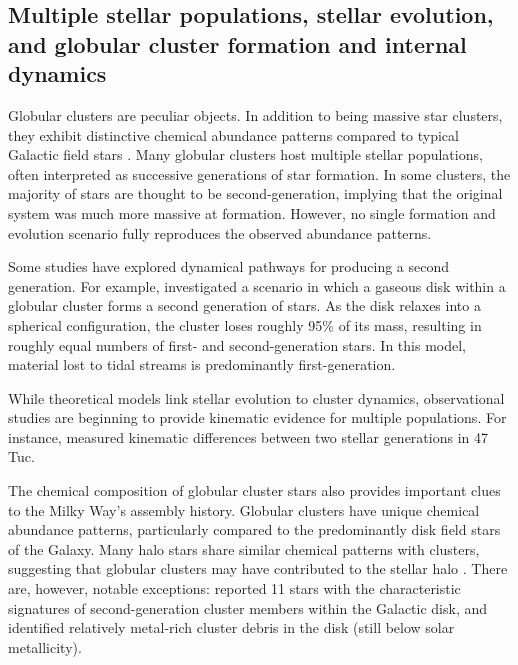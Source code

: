     \subsection{Multiple stellar populations, stellar evolution, and globular cluster formation and internal dynamics}
        Globular clusters are peculiar objects. In addition to being massive star clusters, they exhibit distinctive chemical abundance patterns compared to typical Galactic field stars \citep{2012A&ARv..20...50G,2018ARA&A..56...83B,2019A&ARv..27....8G}. Many globular clusters host multiple stellar populations, often interpreted as successive generations of star formation. In some clusters, the majority of stars are thought to be second-generation, implying that the original system was much more massive at formation. However, no single formation and evolution scenario fully reproduces the observed abundance patterns.

        Some studies have explored dynamical pathways for producing a second generation. For example, \citet{2024A&A...681A..45L} investigated a scenario in which a gaseous disk within a globular cluster forms a second generation of stars. As the disk relaxes into a spherical configuration, the cluster loses roughly 95\% of its mass, resulting in roughly equal numbers of first- and second-generation stars. In this model, material lost to tidal streams is predominantly first-generation.

        While theoretical models link stellar evolution to cluster dynamics, observational studies are beginning to provide kinematic evidence for multiple populations. For instance, \citet{2025MNRAS.537.2342C} measured kinematic differences between two stellar generations in 47 Tuc.        

        The chemical composition of globular cluster stars also provides important clues to the Milky Way's assembly history. Globular clusters have unique chemical abundance patterns, particularly compared to the predominantly disk field stars of the Galaxy. Many halo stars share similar chemical patterns with clusters, suggesting that globular clusters may have contributed to the stellar halo \citep{2016ApJ...825..146M,2017MNRAS.465..501S}. There are, however, notable exceptions: \citet{2017ApJ...846L...2F} reported 11 stars with the characteristic signatures of second-generation cluster members within the Galactic disk, and \citet{2021ApJ...918L..37F} identified relatively metal-rich cluster debris in the disk (still below solar metallicity). 

